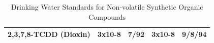 \begin{table}[]
\begin{tabular}{|l|l|l|l|l|}
2,3,7,8-TCDD   (Dioxin)                                                    & 3x10-8                                                             & 7/92                                                                                                              & 3x10-8                                                                                       & 9/8/94                                           \\ \hline
\end{tabular}
\caption{Drinking Water Standards for Non-volatile Synthetic Organic Compounds}
\end{table}


















